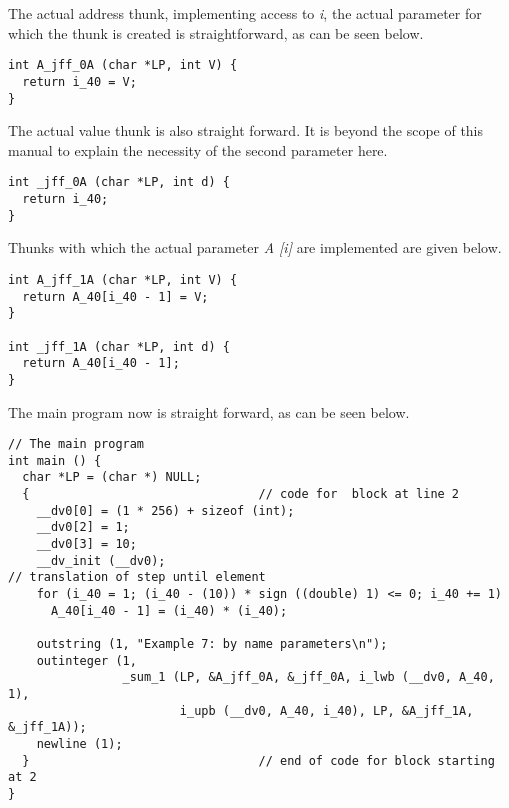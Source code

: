\documentclass[11pt]{article}
\begin{document}
The actual address thunk, implementing access to {\em i}, the actual
parameter for which the thunk is created is straightforward,
as can be seen below.
{\footnotesize
\begin{verbatim}
int A_jff_0A (char *LP, int V) {
  return i_40 = V;
}
\end{verbatim}
}
The actual value thunk is also straight forward. It is beyond the scope
of this manual to explain the necessity of the second parameter here.
{\footnotesize
\begin{verbatim}
int _jff_0A (char *LP, int d) {
  return i_40;
}
\end{verbatim}
}
Thunks with which the actual parameter {\em A [i]} are implemented are given below.
{\footnotesize
\begin{verbatim}
int A_jff_1A (char *LP, int V) {
  return A_40[i_40 - 1] = V;
}

int _jff_1A (char *LP, int d) {
  return A_40[i_40 - 1];
}
\end{verbatim}
}
The main program now is straight forward, as can be seen below.
{\footnotesize
\begin{verbatim}
// The main program
int main () {
  char *LP = (char *) NULL;
  {                                // code for  block at line 2 
    __dv0[0] = (1 * 256) + sizeof (int);
    __dv0[2] = 1;
    __dv0[3] = 10;
    __dv_init (__dv0);
// translation of step until element
    for (i_40 = 1; (i_40 - (10)) * sign ((double) 1) <= 0; i_40 += 1)
      A_40[i_40 - 1] = (i_40) * (i_40);

    outstring (1, "Example 7: by name parameters\n");
    outinteger (1,
                _sum_1 (LP, &A_jff_0A, &_jff_0A, i_lwb (__dv0, A_40, 1),
                        i_upb (__dv0, A_40, i_40), LP, &A_jff_1A, &_jff_1A));
    newline (1);
  }                                // end of code for block starting at 2
}
\end{verbatim}
}
\end{document}
